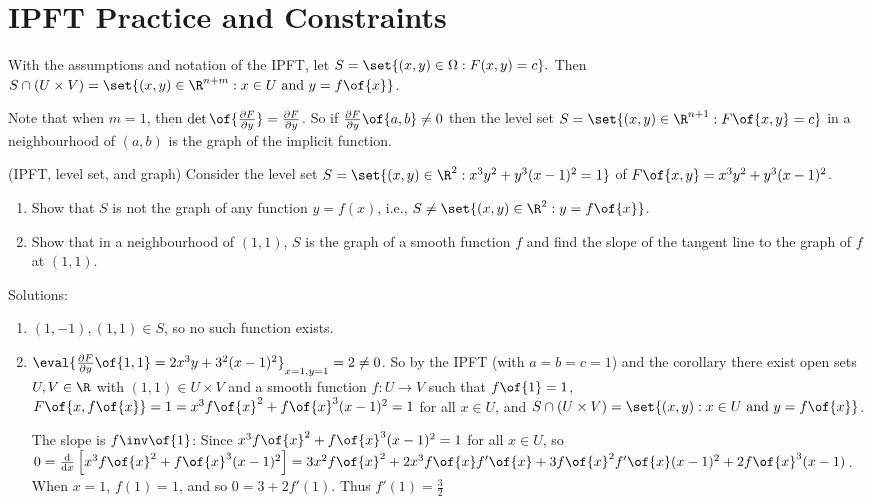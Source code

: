 \chapter{IPFT Practice and Constraints}


\begin{corollary}
    With the assumptions and notation of the IPFT, let $S = \set{(x,y) \in \Omega: F(x,y) = c}.$ Then $S \cap (U \times V) = \set{(x,y) \in \R^{n + m}: x \in U \text{ and } y = f\of{x}}$.
\end{corollary}

\begin{remark}
    Note that when $m=1$, then $\det\of{\frac{\partial F}{\partial y}} = \frac{\partial F}{\partial y}$. So if $\frac{\partial F}{\partial y}\of{a,b} \neq 0$ then the level set $S = \set{(x,y) \in \R^{n+1}: F\of{x,y} = c}$ in a neighbourhood of $(a,b)$ is the graph of the implicit function.
\end{remark}

\begin{example}(IPFT, level set, and graph)
    Consider the level set $S = \set{(x,y) \in \R^2: x^3y^2+y^3(x-1)^2 = 1}$ of $F\of{x,y} = x^3y^2 + y^3(x-1)^2$.
    \begin{enumerate}
        \item Show that $S$ is not the graph of any function $y = f(x)$, i.e., $S \neq \set{(x,y) \in \R^2: y = f\of{x}}$.
        \item Show that in a neighbourhood of $(1,1)$, $S$ is the graph of a smooth function $f$ and find the slope of the tangent line to the graph of $f$ at $(1,1)$.
    \end{enumerate}

    Solutions:
    \begin{enumerate}
        \item $(1,-1), (1,1) \in S$, so no such function exists.
        \item $\eval{\frac{\partial F}{\partial y}\of{1,1} = 2x^3y + 3^2(x-1)^2}_{x=1, y=1} = 2 \neq 0$. So by the IPFT (with $a=b=c=1$) and the corollary there exist open sets $U, V \in \R$ with $(1,1) \in U \times V$ and a smooth function $f: U \to V$ such that $f\of{1} = 1$, $F\of{x, f\of{x}} = 1 = x^3f\of{x}^2 + f\of{x}^3(x-1)^2 = 1$ for all $x \in U$, and $S \cap (U \times V) = \set{(x,y): x \in U \text{ and } y = f\of{x}}$.
        
        The slope is $f\inv\of{1}$: Since $x^3 f\of{x}^2 + f\of{x}^3 (x-1)^2 = 1$ for all $x \in U$, so $0 = \frac{\mathrm{d}}{\mathrm{d}x}\left[x^3 f\of{x}^2 + f\of{x}^3 (x-1)^2\right] = 3x^2 f\of{x}^2 + 2x^3 f\of{x} f'\of{x} + 3f\of{x}^2 f'\of{x} (x-1)^2 + 2f\of{x}^3 (x-1)$.
        When $x = 1$,  $f(1) = 1$, and so $0 = 3 + 2f'(1)$. Thus $f'(1) = \frac{3}{2}$
    \end{enumerate}
\end{example}

